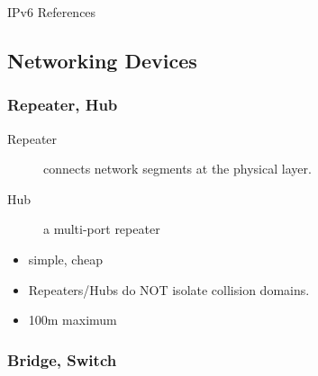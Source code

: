 
\begin{frame}{IPv6 References}
  \begin{refsection}
    \nocite{wiki:ipv6, wiki:ipv6pkt, wiki:ipv6addr, rfc2460, rfc4291}
    \printbibliography[heading=none]
  \end{refsection}
\end{frame}

\subsection{Networking Devices}

\begin{frame}
  \begin{center}
  \end{center}
\end{frame}

\subsubsection{Repeater, Hub}

\begin{frame}
  \begin{description}
  \item[Repeater] connects network segments at the physical layer.
  \item[Hub] a multi-port repeater 
  \end{description}
  \begin{itemize}
  \item simple, cheap
  \item Repeaters/Hubs do NOT isolate collision domains.
  \item 100m maximum
  \end{itemize}    
\end{frame}

\subsubsection{Bridge, Switch}

